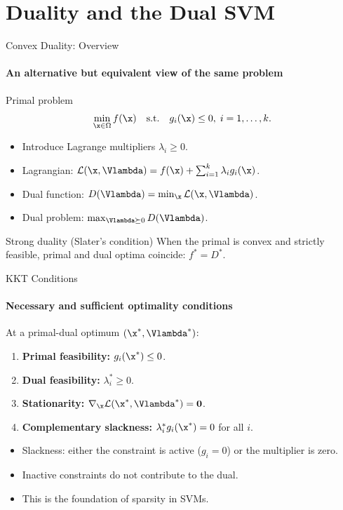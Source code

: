 \section{Duality and the Dual SVM}

\begin{frame}{Convex Duality: Overview}
  \framesubtitle{An alternative but equivalent view of the same problem}
  \begin{block}{Primal problem}
    \[
      \min_{\x\in\Omega} f(\x) \quad \text{s.t.}\quad g_i(\x) \le 0, \; i=1,\ldots,k.
    \]
  \end{block}
  \begin{itemize}
    \item Introduce \alert{Lagrange multipliers} $\lambda_i \ge 0$.
    \item \alert{Lagrangian}: $\mathcal{L}(\x,\Vlambda) = f(\x) + \sum_{i=1}^k \lambda_i g_i(\x)$.
    \item \alert{Dual function}: $D(\Vlambda) = \min_\x \mathcal{L}(\x,\Vlambda)$.
    \item Dual problem: $\max_{\Vlambda \succeq 0} D(\Vlambda)$.
  \end{itemize}
  \begin{alertblock}{Strong duality (Slater's condition)}
    When the primal is convex and strictly feasible, primal and dual optima coincide:
    $f^* = D^*$.
  \end{alertblock}
\end{frame}

\begin{frame}{KKT Conditions}
  \framesubtitle{Necessary and sufficient optimality conditions}
  At a primal-dual optimum $(\x^*, \Vlambda^*)$:
  \vspace{0.3em}
  \begin{enumerate}
    \item \textbf{Primal feasibility:} $g_i(\x^*) \le 0$.
    \item \textbf{Dual feasibility:} $\lambda_i^* \ge 0$.
    \item \textbf{Stationarity:} $\nabla_\x \mathcal{L}(\x^*,\Vlambda^*) = \mathbf{0}$.
    \item \textbf{Complementary slackness:} $\lambda_i^* g_i(\x^*) = 0$ for all $i$.
  \end{enumerate}
  \vspace{0.4em}
  \begin{itemize}
    \item Slackness: either the constraint is \alert{active} ($g_i=0$) or the multiplier is \alert{zero}.
    \item Inactive constraints do not contribute to the dual.
    \item This is the foundation of \alert{sparsity} in SVMs.
  \end{itemize}
\end{frame}

